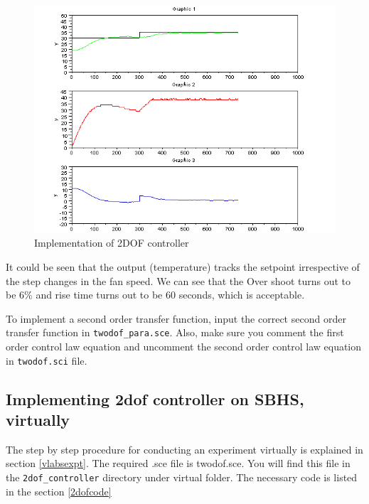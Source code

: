 \begin{figure}
\centering
\includegraphics[width=\linewidth]{2-DOF_manual/2dof_resp.png}
\caption{Implementation of 2DOF controller}
\label{rt_127}
\end{figure}
It could be seen that the output (temperature) tracks the setpoint irrespective of the step changes in the fan speed.
We can see that the Over shoot turns out to be 6\% and rise time turns out to be 60 seconds, which is acceptable.

 To implement a second order transfer function, input the correct second order transfer function in {\tt twodof\_para.sce}. Also, make sure you comment the first order control law equation and uncomment the second order control law equation in {\tt twodof.sci} file.

\subsection{Implementing 2dof controller on SBHS, virtually}
The step by step procedure for conducting an experiment virtually is explained in section \ref{vlabsexpt}. The required .sce file is twodof.sce. You will find this file in the {\tt 2dof\_controller} directory under virtual folder. The necessary code is listed in the section \ref{2dofcode}


